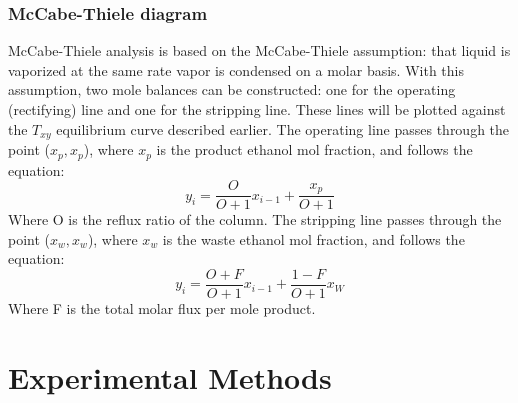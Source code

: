 \documentclass[lettersize,journal]{IEEEtran}
\begin{document}
	\subsubsection{McCabe-Thiele diagram}
	McCabe-Thiele analysis is based on the McCabe-Thiele assumption: that liquid is vaporized at the same rate vapor is condensed on a molar basis. With this assumption, two mole balances can be constructed: one for the operating (rectifying) line and one for the stripping line. These lines will be plotted against the $T_{xy}$ equilibrium curve described earlier. The operating line passes through the point ($x_{p},x_{p}$), where $x_{p}$ is the product ethanol mol fraction, and follows the equation:
	\begin{equation}
		\label{deqn_ex5.5}
		y_{i} = \frac{O}{O+1}x_{i-1} + \frac{x_{p}}{O+1}
	\end{equation}
	Where O is the reflux ratio of the column. The stripping line passes through the point ($x_{w},x_{w}$), where $x_{w}$ is the waste ethanol mol fraction, and follows the equation:
	\begin{equation}
		\label{deqn_ex5.5}
		y_{i} = \frac{O+F}{O+1}x_{i-1} + \frac{1-F}{O+1}x_{W}
	\end{equation}
	Where F is the total molar flux per mole product.
	
	
	
	
	\section{Experimental Methods}
\end{document}
